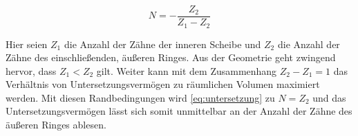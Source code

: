 		\begin{equation}
			N = -\frac{Z_2}{Z_1 - Z_2}%
			\label{eq:untersetzung}
		\end{equation}

		Hier seien \(Z_1\) die Anzahl der Zähne der inneren Scheibe und \(Z_2\) die Anzahl der Zähne des einschließenden, äußeren Ringes.
		Aus der Geometrie geht zwingend hervor, dass \(Z_1 < Z_2\) gilt.
		Weiter kann mit dem Zusammenhang \(Z_2 - Z_1 = 1\) das Verhältnis von Untersetzungsvermögen zu räumlichen Volumen maximiert werden.
		Mit diesen Randbedingungen wird \cref{eq:untersetzung} zu \(N = Z_2\) und das Untersetzungsvermögen lässt sich somit unmittelbar an der Anzahl der Zähne des äußeren Ringes ablesen.